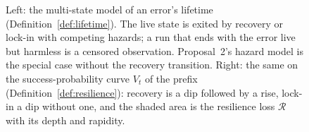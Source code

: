 \begin{figure}[h]
\caption{Left: the multi-state model of an error's lifetime (Definition~\ref{def:lifetime}). The live state is exited by recovery or lock-in with competing hazards; a run that ends with the error live but harmless is a censored observation. Proposal~2's hazard model is the special case without the recovery transition. Right: the same on the success-probability curve $V_t$ of the prefix (Definition~\ref{def:resilience}): recovery is a dip followed by a rise, lock-in a dip without one, and the shaded area is the resilience loss $\mathcal{R}$ with its depth and rapidity.}
\label{fig:lifecycle}
\end{figure}

